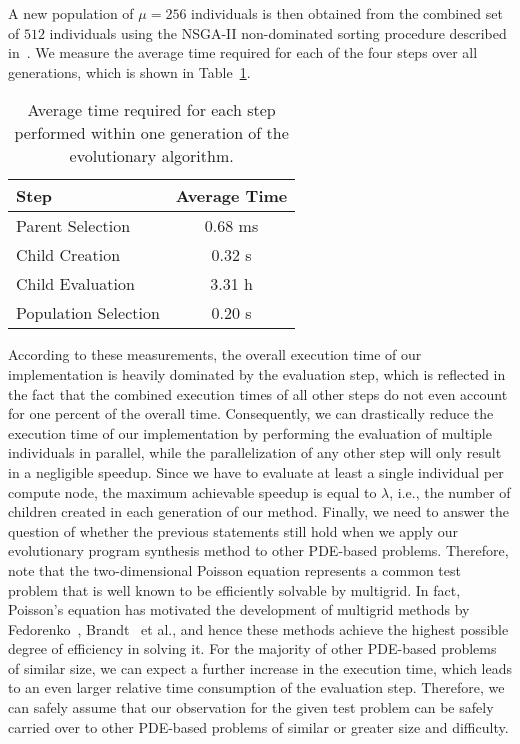 A new population of $\mu = 256$ individuals is then obtained from the combined set of $512$ individuals using the NSGA-II non-dominated sorting procedure described in~\cite{deb2002fast}.
We measure the average time required for each of the four steps over all generations, which is shown in Table~\ref{table:evolutionary-search-profiling}.
\begin{table}
	\caption{Average time required for each step performed within one generation of the evolutionary algorithm.}
	\label{table:evolutionary-search-profiling}
	\centering
	\begin{tabular}{l c}
		\toprule
		Step & Average Time \\
		\midrule
		Parent Selection & 0.68 ms \\
		\midrule
		Child Creation  & 0.32 s \\
		\midrule
		Child Evaluation  & 3.31 h \\
		\midrule
		Population Selection  & 0.20 s \\
		\bottomrule
	\end{tabular}
\end{table}
According to these measurements, the overall execution time of our implementation is heavily dominated by the evaluation step, which is reflected in the fact that the combined execution times of all other steps do not even account for one percent of the overall time.
Consequently, we can drastically reduce the execution time of our implementation by performing the evaluation of multiple individuals in parallel, while the parallelization of any other step will only result in a negligible speedup. 
Since we have to evaluate at least a single individual per compute node, the maximum achievable speedup is equal to $\lambda$, i.e., the number of children created in each generation of our method.
Finally, we need to answer the question of whether the previous statements still hold when we apply our evolutionary program synthesis method to other PDE-based problems.
Therefore, note that the two-dimensional Poisson equation represents a common test problem that is well known to be efficiently solvable by multigrid.
In fact, Poisson's equation has motivated the development of multigrid methods by Fedorenko~\cite{fedorenko1962relaxation}, Brandt~\cite{brandt1977multi} et al., and hence these methods achieve the highest possible degree of efficiency in solving it.
For the majority of other PDE-based problems of similar size, we can expect a further increase in the execution time, which leads to an even larger relative time consumption of the evaluation step.
Therefore, we can safely assume that our observation for the given test problem can be safely carried over to other PDE-based problems of similar or greater size and difficulty.

